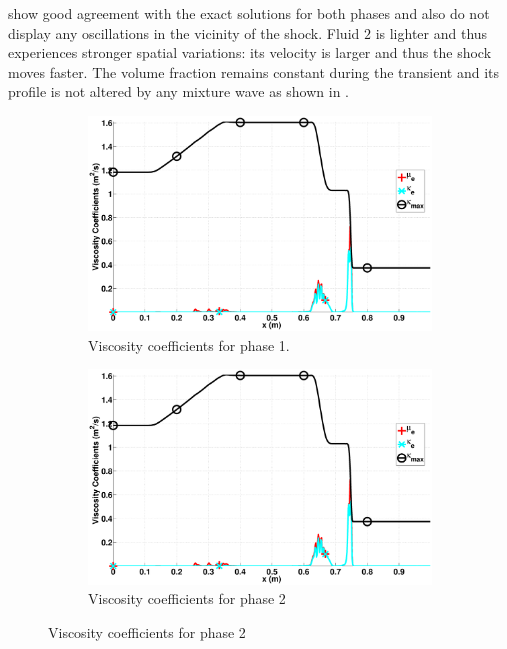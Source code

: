 \documentclass[preprint,10pt]{elsarticle}
\begin{document}
show good agreement with the exact solutions for both phases and also do not display any oscillations in the vicinity of the shock. Fluid $2$ is 
lighter and thus experiences stronger spatial variations: its velocity is larger and thus the shock moves faster. The volume fraction remains constant during 
the transient and its profile is not altered by any mixture wave as shown in .
%
\begin{figure}[H]
        \centering
        \begin{subfigure}[b]{0.495\textwidth}
                \centering
                \includegraphics[width=\textwidth]{figures/two_phases_vapor_viscosity_kappa_mu.eps}
                \caption{Viscosity coefficients for phase 1.}
                \label{fig:indp-phase-1}
        \end{subfigure}%
        \begin{subfigure}[b]{0.495\textwidth}
                \centering
                \includegraphics[width=\textwidth]{figures/two_phases_vapor_viscosity_kappa_mu.eps}
                \caption{Viscosity coefficients for phase 2}
                \label{fig:indp-phase-2}
        \end{subfigure}
        

\end{figure}
\end{document}
